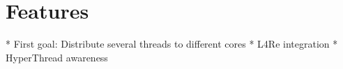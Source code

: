 \section{Features}
\label{design:features}

* First goal: Distribute several threads to different cores
* L4Re integration
* HyperThread awareness
